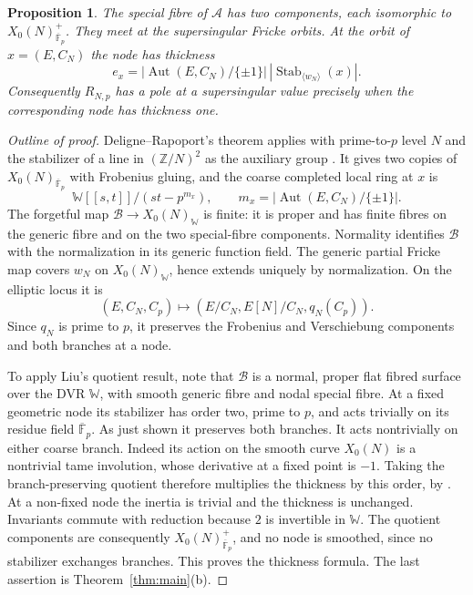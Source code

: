 \documentclass[11pt,a4paper]{article}
\numberwithin{equation}{section}
\newtheorem{proposition}[theorem]{Proposition}
\theoremstyle{definition}
\theoremstyle{remark}
\newcommand{\Fb}{\overline{\mathbb F}_p}
\newcommand{\Z}{\mathbb Z}
\newcommand{\Aut}{\operatorname{Aut}}
\newcommand{\Stab}{\operatorname{Stab}}
\begin{document}
\begin{proposition}\label{prop:geometry}
The special fibre of $\mathcal A$ has two components, each isomorphic to
$X_0(N)^+_{\Fb}$. They meet at the supersingular Fricke orbits. At the orbit of
$x=(E,C_N)$ the node has thickness
\[
e_x=|\Aut(E,C_N)/\{\pm1\}|\,
|\Stab_{\langle w_N\rangle}(x)|.
\]
Consequently $R_{N,p}$ has a pole at a supersingular value precisely when the
corresponding node has thickness one.
\end{proposition}
\begin{proof}[Outline of proof]
Deligne--Rapoport's theorem applies with prime-to-$p$ level $N$ and the stabilizer
of a line in $(\Z/N)^2$ as the auxiliary group
\citep[V, 1.14--1.20; VI, Theorem~6.9, especially (6.9.1)]{DR73}.
It gives two copies of $X_0(N)_{\Fb}$ with Frobenius gluing, and the coarse
completed local ring at $x$ is
\[
\mathbb W[[s,t]]/(st-p^{m_x}),\qquad m_x=|\Aut(E,C_N)/\{\pm1\}|.
\]
The forgetful map $\mathcal B\to X_0(N)_{\mathbb W}$ is finite: it is proper and has finite
fibres on the generic fibre and on the two special-fibre components.
Normality identifies $\mathcal B$ with the normalization in its generic function
field. The generic partial Fricke map covers $w_N$ on $X_0(N)_{\mathbb W}$, hence extends
uniquely by normalization. On the elliptic locus it is
\[
(E,C_N,C_p)\longmapsto(E/C_N,E[N]/C_N,q_N(C_p)).
\]
Since $q_N$ is prime to $p$, it preserves the Frobenius and Verschiebung components
and both branches at a node.

To apply Liu's quotient result, note that $\mathcal B$ is a normal,
proper flat fibred surface over the DVR $\mathbb W$, with smooth generic fibre
and nodal special fibre. At a fixed geometric node its stabilizer has
order two, prime to $p$, and acts trivially on its residue field $\Fb$.
As just shown it preserves both branches. It acts nontrivially on either
coarse branch. Indeed its action on the smooth curve $X_0(N)$ is a nontrivial
tame involution, whose derivative at a fixed point is $-1$.
Taking the branch-preserving quotient therefore multiplies the thickness by
this order, by \citet[Proposition~10.3.48(b)--(c), pp.~526--528]{Liu02}.
At a non-fixed node the inertia is trivial and the thickness is unchanged.
Invariants commute with reduction because $2$ is invertible in $\mathbb W$.
The quotient components are consequently $X_0(N)^+_{\Fb}$, and no node is
smoothed, since no stabilizer exchanges branches. This proves the thickness formula.
The last assertion is Theorem~\ref{thm:main}(b).
\end{proof}
\end{document}
